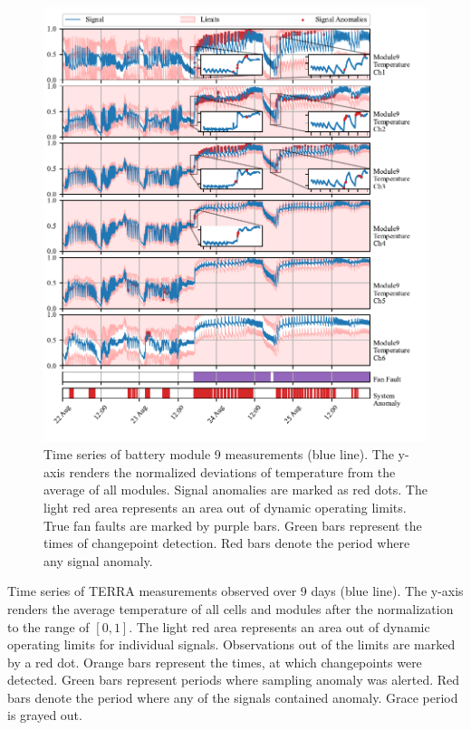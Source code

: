 \begin{figure}[htbp]
 \centerline{\includegraphics{figures/Kokam_thresh_first_zoom.pdf}}
 \caption{Time series of battery module 9 measurements (blue line). The y-axis renders the normalized deviations of temperature from the average of all modules. Signal anomalies are marked as red dots. The light red area represents an area out of dynamic operating limits. True fan faults are marked by purple bars. Green bars represent the times of changepoint detection. Red bars denote the period where any signal anomaly.}
 \label{fig:kokam_first}
\end{figure}

Time series of TERRA measurements observed over 9 days (blue line). The y-axis renders the average temperature of all cells and modules after the normalization to the range of $[0, 1]$. The light red area represents an area out of dynamic operating limits for individual signals. Observations out of the limits are marked by a red dot. Orange bars represent the times, at which changepoints were detected. Green bars represent periods where sampling anomaly was alerted. Red bars denote the period where any of the signals contained anomaly. Grace period is grayed out.

